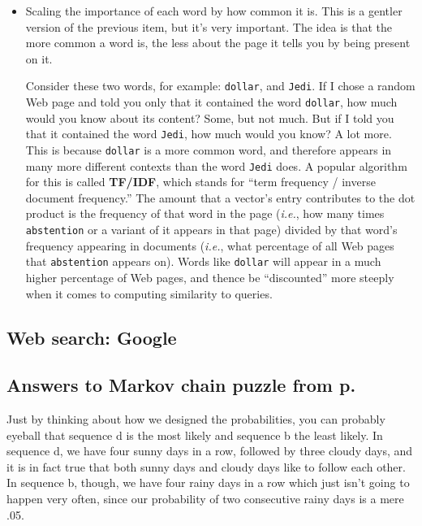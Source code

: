 \begin{alttitles}
\begin{itemize}

\item Scaling the importance of each word by how common it is. This is a
gentler version of the previous item, but it's very important. The idea is that
the more common a word is, the less about the page it tells you by being
present on it.

Consider these two words, for example: \texttt{dollar}, and \texttt{Jedi}. If I
chose a random Web page and told you only that it contained the word
\texttt{dollar}, how much would you know about its content? Some, but not much.
But if I told you that it contained the word \texttt{Jedi}, how much would you
know? A lot more. This is because \texttt{dollar} is a more common word, and
therefore appears in many more different contexts than the word \texttt{Jedi}
does. A popular algorithm for this is called \textbf{TF/IDF}, which stands for
``term frequency / inverse document frequency.'' The amount that a vector's
entry contributes to the dot product is the frequency of that word in the page
(\textit{i.e.}, how many times \texttt{abstention} or a variant of it appears
in that page) divided by that word's frequency appearing in documents
(\textit{i.e.}, what percentage of all Web pages that \texttt{abstention}
appears on). Words like \texttt{dollar} will appear in a much higher percentage
of Web pages, and thence be ``discounted'' more steeply when it comes to
computing similarity to queries.

\end{itemize}

\subsection{Web search: Google}

\vfill
\pagebreak

\subsection*{Answers to Markov chain puzzle from
p.~\pageref{markovPuzzle}}

Just by thinking about how we designed the probabilities, you can probably
eyeball that sequence d is the most likely and sequence b the least likely. In
sequence d, we have four sunny days in a row, followed by three cloudy days,
and it is in fact true that both sunny days and cloudy days like to follow each
other. In sequence b, though, we have four rainy days in a row which just
isn't going to happen very often, since our probability of two consecutive
rainy days is a mere .05.


\end{alttitles}
